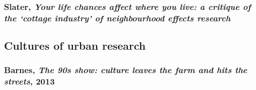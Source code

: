 \documentclass{article}
\begin{document}
\begin{outline}
	\1
\end{outline}

\subsubsection{Slater, \textit{Your life chances affect where you live: a critique of the `cottage industry' of neighbourhood effects research}}

\begin{outline}
	\1
\end{outline}

\subsection{Cultures of urban research}

\subsubsection{Barnes, \textit{The 90s show: culture leaves the farm and hits the streets}, 2013}
\end{document}
